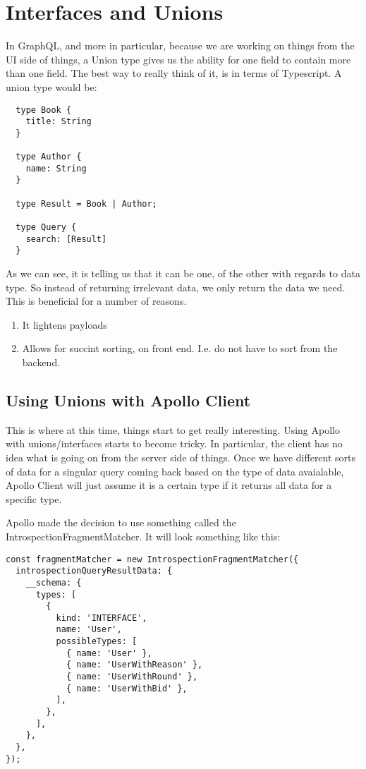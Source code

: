 \maketitle{}
\section{ Interfaces and Unions }

In GraphQL, and more in particular, because we are working on things from the
UI side of things, a Union type gives us the ability for one field to contain
more than one field. The best way to really think of it, is in terms of
Typescript. A union type would be:
\begin{lstlisting}
  type Book {
    title: String
  }

  type Author {
    name: String
  }

  type Result = Book | Author;

  type Query {
    search: [Result]
  }
\end{lstlisting}

As we can see, it is telling us that it can be one, of the other with regards
to data type. So instead of returning irrelevant data, we only return the data
we need. This is beneficial for a number of reasons.
\begin{enumerate}
  \item It lightens payloads
  \item Allows for succint sorting, on front end. I.e. do not have to sort from
  the backend.
\end{enumerate}

\subsection{ Using Unions with Apollo Client }
This is where at this time, things start to get really interesting. Using Apollo
with unions/interfaces starts to become tricky. In particular, the client has
no idea what is going on from the server side of things. Once we have different
sorts of data for a singular query coming back based on the type of data
avaialable, Apollo Client will just assume it is a certain type if it returns
all data for a specific type.

Apollo made the decision to use something called the
IntrospectionFragmentMatcher. It will look something like this:
\begin{lstlisting}
const fragmentMatcher = new IntrospectionFragmentMatcher({
  introspectionQueryResultData: {
    __schema: {
      types: [
        {
          kind: 'INTERFACE',
          name: 'User',
          possibleTypes: [
            { name: 'User' },
            { name: 'UserWithReason' },
            { name: 'UserWithRound' },
            { name: 'UserWithBid' },
          ],
        },
      ],
    },
  },
});
\end{lstlisting}

